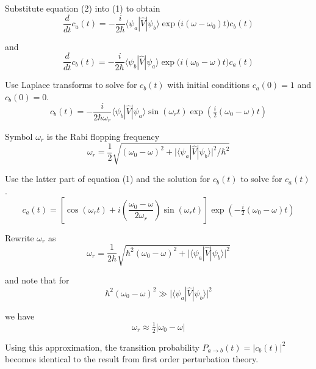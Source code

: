 Substitute equation (2) into (1) to obtain
\begin{equation*}
\frac{d}{dt}c_a(t)=-\frac{i}{2\hbar}\langle\psi_a|\hat V|\psi_b\rangle
\exp\bigl(i(\omega-\omega_0)t\bigr)c_b(t)
\tag{3}
\end{equation*}

and
\begin{equation*}
\frac{d}{dt}c_b(t)=-\frac{i}{2\hbar}\langle\psi_b|\hat V|\psi_a\rangle
\exp\bigl(i(\omega_0-\omega)t\bigr)c_a(t)
\tag{4}
\end{equation*}

Use Laplace transforms to solve for $c_b(t)$ with initial conditions $c_a(0)=1$ and $c_b(0)=0$.
\begin{equation*}
c_b(t)=-\frac{i}{2\hbar\omega_r}\langle\psi_b|\hat V|\psi_a\rangle
\sin(\omega_rt)\exp\left(\tfrac{i}{2}(\omega_0-\omega)t\right)
\end{equation*}

Symbol $\omega_r$ is the Rabi flopping frequency
\begin{equation*}
\omega_r=\frac{1}{2}\sqrt{(\omega_0-\omega)^2
+\bigl|\langle\psi_a|\hat V|\psi_b\rangle\bigr|^2/\hbar^2}
\end{equation*}

Use the latter part of equation (1) and the solution for $c_b(t)$ to solve for $c_a(t)$.
\begin{equation*}
c_a(t)=\left[\cos(\omega_rt)+i\left(\frac{\omega_0-\omega}{2\omega_r}\right)\sin(\omega_rt)\right]
\exp\left(-\tfrac{i}{2}(\omega_0-\omega)t\right)
\end{equation*}

Rewrite $\omega_r$ as
\begin{equation*}
\omega_r=\frac{1}{2\hbar}\sqrt{\hbar^2(\omega_0-\omega)^2
+\bigl|\langle\psi_a|\hat V|\psi_b\rangle\bigr|^2}
\end{equation*}

and note that for
\begin{equation*}
\hbar^2(\omega_0-\omega)^2\gg\bigl|\langle\psi_a|\hat V|\psi_b\rangle\bigr|^2
\end{equation*}

we have
\begin{equation*}
\omega_r\approx\tfrac{1}{2}|\omega_0-\omega|
\end{equation*}

Using this approximation, the transition probability
$P_{a\rightarrow b}(t)=|c_b(t)|^2$
becomes identical to the result from first order perturbation theory.



